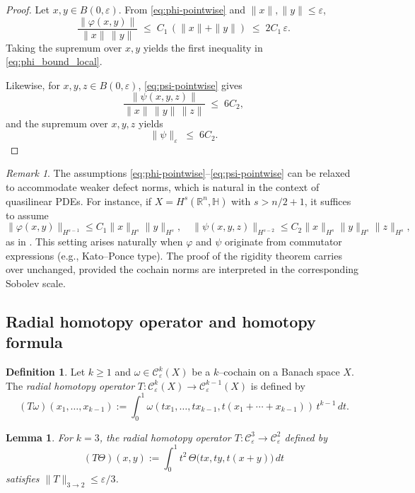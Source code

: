 \documentclass[10pt]{amsart}
\numberwithin{equation}{section}
\newtheorem{lem}[theorem]{Lemma}
\theoremstyle{remark}
\newtheorem{rmk}[theorem]{Remark}
\theoremstyle{definition}
\newtheorem{dfn}[theorem]{Definition}
\begin{document}
\begin{proof}
Let $x,y\in B(0,\varepsilon)$. From \eqref{eq:phi-pointwise} and $\|x\|,\|y\|\le \varepsilon$,
\[
\frac{\|\varphi(x,y)\|}{\|x\|\,\|y\|}
\;\le\;
C_1\,(\|x\|+\|y\|)
\;\le\; 2 C_1\,\varepsilon.
\]
Taking the supremum over $x,y$ yields the first inequality in \eqref{eq:phi_bound_local}.

Likewise, for $x,y,z\in B(0,\varepsilon)$, \eqref{eq:psi-pointwise} gives
\[
\frac{\|\psi(x,y,z)\|}{\|x\|\,\|y\|\,\|z\|}
\;\le\; 6 C_2,
\]
and the supremum over $x,y,z$ yields
\begin{equation}\label{eq:psi_bound}
\|\psi\|_\varepsilon \;\le\; 6 C_2.
\end{equation}
\end{proof}
\begin{rmk}
The assumptions \eqref{eq:phi-pointwise}–\eqref{eq:psi-pointwise} can be relaxed to accommodate weaker defect norms, which is natural in the context of quasilinear PDEs. For instance, if \(X = H^s(\mathbb{R}^n, \mathbb{H})\) with \(s > n/2 + 1\), it suffices to assume
\[
\|\varphi(x,y)\|_{H^{s-1}} \leq C_1 \|x\|_{H^s} \|y\|_{H^s}, \quad
\|\psi(x,y,z)\|_{H^{s-2}} \leq C_2 \|x\|_{H^s} \|y\|_{H^s} \|z\|_{H^s},
\]
as in \cite{Bauer2020}. This setting arises naturally when \(\varphi\) and \(\psi\) originate from commutator expressions (e.g., Kato–Ponce type). The proof of the rigidity theorem carries over unchanged, provided the cochain norms are interpreted in the corresponding Sobolev scale.
\end{rmk}
\subsection{Radial homotopy operator and homotopy formula}
\begin{dfn}\label{def:T}
Let $k\ge1$ and $\omega\in\mathcal C^k_\varepsilon(X)$ be a $k$--cochain on a Banach space $X$.
The \emph{radial homotopy operator}
$T:\mathcal C^k_\varepsilon(X)\to\mathcal C^{k-1}_\varepsilon(X)$
is defined by
\[
  (T\omega)(x_1,\dots,x_{k-1})
  := \int_0^1 \omega(tx_1,\dots,tx_{k-1},t(x_1+\cdots+x_{k-1}))\,t^{k-1}\,dt.
\]
\end{dfn}

\begin{lem}\label{lem:T bound}
For $k=3$, the radial homotopy operator $T:\mathcal C^3_\varepsilon\to \mathcal C^2_\varepsilon$ defined by
\[
(T\Theta)(x,y):=\int_0^1 t^{2}\,\Theta\big(tx,ty,t(x+y)\big)\,dt
\]
satisfies $\|T\|_{3\to 2}\le \varepsilon/3$.
\end{lem}
\end{document}

